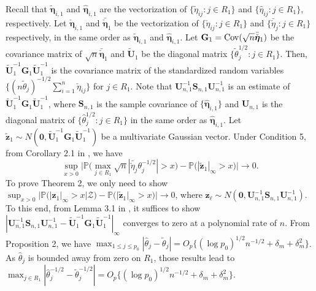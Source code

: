 \documentclass[12pt]{article}
\numberwithin{equation}{section}
\def\be{\begin{equation}}
\def\ee{\end{equation}}
\def\AZ{{ \mathrm{\scriptscriptstyle AZ} }}
\newcommand{\Cov}{\rm Cov}
\newcommand{\bG}{{\mathbf G}}
\newcommand{\bS}{{\mathbf S}}
\newcommand{\bU}{{\mathbf U}}
\newcommand{\bz}{{\mathbf z}}
\newcommand{\bfeta}  {\boldsymbol{\eta}}
\newcommand{\bzero}{{\mathbf 0}}
\begin{document}
Recall that $\tilde{\bfeta}_{i, 1}$ and $\hat{\bfeta}_{i, 1}$ are the vectorization of $\{\tilde{\eta}_{ij}: j \in R_{1}\}$ and $\{\hat{\eta}_{ij}: j \in R_{1}\}$, respectively. 
Let $\check{\bfeta}_{i, 1}$ and $\bar{\check{\bfeta}}_{1}$ be the vectorization of $\{\check{\eta}_{ij}: j \in R_{1}\}$ and $\{\bar{\check\eta}_{j} : j \in R_{1}\}$ respectively, in the same order as $\tilde{\bfeta}_{i, 1}$ and $\hat{\bfeta}_{i, 1}$.
Let $\bG_{1} = {\Cov}(\sqrt{n}\bar{\check{\bfeta}}_{1})$ be the covariance matrix of $\sqrt{n}\bar{\check{\bfeta}}_{1}$ and $\tilde{\bU}_{1}$ be the diagonal matrix $\{\tilde{\theta}_j^{1/2}: j \in R_1\}$. 
Then, $\tilde{\bU}_{1}^{-1}\bG_{1}\tilde{\bU}_{1}^{-1}$ is the covariance matrix of the standardized random variables $\{(n \tilde{\theta}_{j})^{-1/2}\sum_{i = 1}^{n}\check{\eta}_{ij}\}$ for $j \in R_1$.
Note that $\bU_{n, 1}^{-1} \bS_{n, 1} \bU_{n, 1}^{-1}$ is an estimate of $\tilde{\bU}_{1}^{-1}\bG_{1}\tilde{\bU}_{1}^{-1}$, where $\bS_{n, 1}$ is the sample covariance of $\{\hat{\bfeta}_{i, 1}\}$ and $\bU_{n, 1}$ is the diagonal matrix of $\{\hat{\theta}_{j}^{1/2}: j \in R_1\}$ in the same order as $\hat{\bfeta}_{i, 1}$.
Let $\tilde{\bz}_1 \sim N(\bzero, \tilde{\bU}_{1}^{-1}\bG_{1}\tilde{\bU}_{1}^{-1})$ be a multivariate Gaussian vector. 
Under Condition 5, from Corollary 2.1 in \cite{chernozhukov2013gaussian}, we have
\be
\sup_{x>0}\big|\mathbb{P}\big(\max_{j \in R_1} \sqrt{n}|\bar{\check\eta}_{j} \theta_{j}^{-1/2}| > x\big) - \mathbb{P}\big(|\tilde{\bz}_1|_\infty > x\big)\big| \xrightarrow{} 0.
\label{eq:GA-1}\ee
To prove Theorem 2, we only need to show $\sup_{x>0}\big|\mathbb{P}\big(|\bz_1|_{\infty} > x | \mathcal{Z} \big) - \mathbb{P}\big(|\tilde{\bz}_1|_\infty > x\big)\big| \xrightarrow{} 0$, where $\bz_{\ell} \sim N(\bzero, \bU_{n, 1}^{-1} \bS_{n, 1} \bU_{n, 1}^{-1})$. To this end, from Lemma 3.1 in \cite{chernozhukov2013gaussian}, it suffices to show $|\bU_{n, 1}^{-1} \bS_{n, 1} \bU_{n, 1}^{-1} - \tilde{\bU}_{1}^{-1}\bG_{1}\tilde{\bU}_{1}^{-1}|_{\infty}$ converges to zero at a polynomial rate of $n$.
From Proposition 2, we have 
$\max_{1 \leq j \leq p_0} |\hat{\theta}_j - \tilde{\theta}_{j}| = O_{p}\{(\log p_0)^{1/2} n^{-1/2} + \delta_m + \delta_m^2\}$. 
As $\hat{\theta}_j$ is bounded away from zero on $R_1$, those results lead to
$\max_{j \in R_1} |\hat{\theta}_j^{-1/2} - \tilde{\theta}_{j}^{-1/2}| = O_{p}\{(\log p_0)^{1/2} n^{-1/2} + \delta_m + \delta_m^2\}$. 
\end{document}
